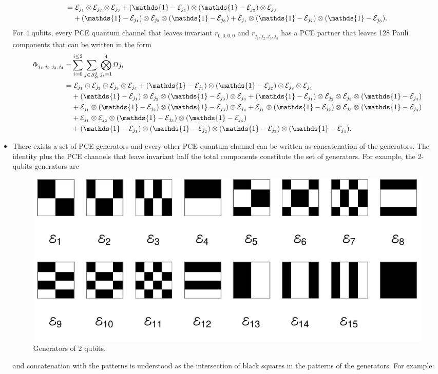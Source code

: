 \documentclass[11pt,dvipsnames]{article} %
\newcommand{\E}{\mathcal{E}}
\newcommand{\Ej}[1]{\E_{j_{#1}}}
\newcommand{\id}[1]{\qty(\1-\E_{j_{#1}})}
\newcommand{\1}{\mathds{1}}
\newcommand{\ot}{\otimes}
\begin{document}
\begin{itemize}
\begin{align}
=&\ \Ej{1}\ot\Ej{2}\ot\Ej{3} + \id{1}\ot\id{2}\ot\Ej{3} \\
&+ \id{1}\ot\Ej{2}\ot\id{3} + \Ej{1}\ot\id{2}\ot\id{3}. \nonumber
\end{align}
For 4 qubits, every PCE quantum channel that leaves invariant $r_{0,0,0,0}$ 
and  $r_{j_1,j_2,j_3,j_4}$ has a PCE partner that leaves 128 Pauli components 
that can be written in the form
\begin{align}
\Phi_{j_1,j_2,j_3,j_4}=& \sum_{i=0}^{i\leq 2}
\sum_{j\in \mathcal{S}_{2i}^4}
\bigotimes_{j_i=1}^4\Omega{j_i} \nonumber \\
=&\ \Ej{1}\ot\Ej{2}\ot\Ej{3}\ot\Ej{4} + 
\qty(\1-\Ej{1})\ot\qty(\1-\Ej{2})\ot\Ej{3}\ot\Ej{4} \nonumber \\
&+ \qty(\1-\Ej{1})\ot\Ej{2}\ot\qty(\1-\Ej{3})\ot\Ej{4}
+ \qty(\1-\Ej{1})\ot\Ej{2}\ot\Ej{3}\ot\qty(\1-\Ej{4}) \\
&+ \Ej{1}\ot\qty(\1-\Ej{2})\ot\qty(\1-\Ej{3})\ot\Ej{4}
+ \Ej{1}\ot\qty(\1-\Ej{2})\ot\Ej{3}\ot\qty(\1-\Ej{4}) \nonumber \\
&+ \Ej{1}\ot\Ej{2}\ot\qty(\1-\Ej{3})\ot\qty(\1-\Ej{4}) \nonumber \\
&+ \id{1}\ot\id{2}\ot\id{3}\ot\id{4}. \nonumber
\end{align}

\item There exists a set of PCE generators and every other PCE 
quantum channel can be written as concatenation of the generators.
The identity plus the PCE channels that leave invariant half the total 
components constitute the set of generators. For example, 
the 2-qubits generators are

\begin{figure}[H]
  \centering
  \includegraphics[width=.75\textwidth]{2Q-fundamentals}
  \caption{Generators of 2 qubits.}
  \label{fig:2qubits-generators}
\end{figure}
and concatenation with the patterns is understood as the intersection
of black squares in the patterns of the generators. For example:


\end{itemize}
\end{document}
